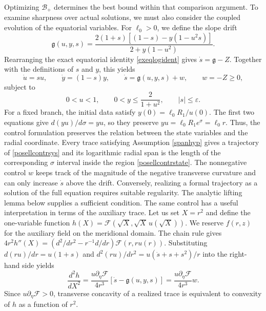 \documentclass[amsmath,amsfonts,amssymb,aps,pra,superscriptaddress,10pt]{revtex4-2}
\numberwithin{equation}{section}
\theoremstyle{plain}
\theoremstyle{definition}
\theoremstyle{remark}
\theoremstyle{definition}
\newcommand{\ellzero}{\ell_0}
\begin{document}
Optimizing $\mathcal{B}_+$ determines the best bound within that comparison argument. To examine sharpness over actual solutions, we must also consider the coupled evolution of the equatorial variables. For $\ellzero>0$, we define the slope drift
\begin{equation}
\mathfrak{g}(u,y,s)=\frac{2(1+s)[(1-s)-y(1-u^2s)]}{2+y(1-u^2)}.
\end{equation}
Rearranging the exact equatorial identity \eqref{exeqlogident} gives $\dot{s}=\mathfrak{g}-Z$. Together with the definitions of $s$ and $y$, this yields
\begin{equation}\label{posellcontrsys}
\dot{u}=su,\qquad
\dot{y}=(1-s)y,\qquad
\dot{s}=\mathfrak{g}(u,y,s)+w,\qquad 
w=-Z\geq 0,
\end{equation}
subject to
\begin{equation}\label{posellcontrstate}
0<u<1,\qquad
0<y\leq\frac{2}{1+u^2},\qquad
|s|\leq\varepsilon.
\end{equation}
For a fixed branch, the initial data satisfy $y(0)=\ellzero R_1/u(0)$. The first two equations give $d(yu)/d\sigma=yu$, so they preserve $yu=\ellzero R_1 e^\sigma=\ellzero r$. Thus, the control formulation preserves the relation between the state variables and the radial coordinate. Every trace satisfying Assumption \ref{spanhyp} gives a trajectory of \eqref{posellcontrsys} and its logarithmic radial span is the length of the corresponding $\sigma$ interval inside the region \eqref{posellcontrstate}. The nonnegative control $w$ keeps track of the magnitude of the negative transverse curvature and can only increase $\dot{s}$ above the drift. Conversely, realizing a formal trajectory as a solution of the full equation requires suitable regularity. The analytic lifting lemma below supplies a sufficient condition. The same control has a useful interpretation in terms of the auxiliary trace. Let us set $X=r^2$ and define the one-variable function $h(X)=\mathcal{F}(\sqrt{X},\sqrt{X}\,u(\sqrt{X}))$. We reserve $f(r,z)$ for the auxiliary field on the meridional domain. The chain rule gives $4r^2 h''(X)=(d^2/dr^2-r^{-1}d/dr)\mathcal{F}(r,ru(r))$. Substituting $d(ru)/dr=u(1+s)$ and $d^2(ru)/dr^2=u(\dot{s}+s+s^2)/r$ into the right-hand side yields
\begin{equation}
\frac{d^2h}{dX^2}=\frac{u\partial_\eta\mathcal{F}}{4r^3}[\dot{s}-\mathfrak{g}(u,y,s)]=\frac{u\partial_\eta\mathcal{F}}{4r^3}w.
\end{equation}
Since $u\partial_\eta\mathcal{F}>0$, transverse concavity of a realized trace is equivalent to convexity of $h$ as a function of $r^2$.
\end{document}
